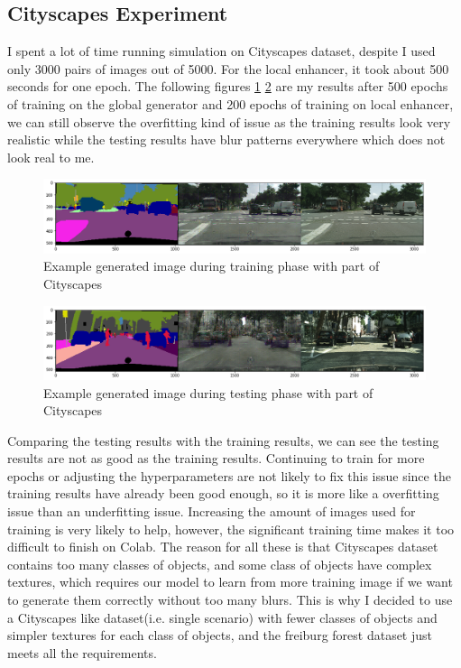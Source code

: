 \subsection{Cityscapes Experiment}
I spent a lot of time running simulation on Cityscapes dataset, despite I used only 3000 
pairs of images out of 5000. For the local enhancer, it took about 500 seconds for one 
epoch. The following figures \ref{fig:Cityscapes-train} \ref{fig:Cityscapes-test} are my 
results after 500 epochs of training on the global generator and 200 epochs of training 
on local enhancer, we can still observe the overfitting kind of issue as the training 
results look very realistic while the testing results have blur patterns everywhere 
which does not look real to me.
\begin{figure}[H]
    \begin{center}
    \includegraphics[width=14cm]{figures/cityscapes-train}
    \end{center}
    \caption{Example generated image during training phase with part of Cityscapes}
    \label{fig:Cityscapes-train}
\end{figure}

\begin{figure}[H]
    \begin{center}
    \includegraphics[width=14cm]{figures/cityscapes-test}
    \end{center}
    \caption{Example generated image during testing phase with part of Cityscapes}
    \label{fig:Cityscapes-test}
\end{figure}

Comparing the testing results with the training results, we can see the testing results
are not as good as the training results.
Continuing to train for more epochs or adjusting the hyperparameters are not likely to fix 
this issue since the training results have already been good enough, so it is more like a 
overfitting issue than an underfitting issue. Increasing the amount of images used for 
training is very likely to help, however, the significant training time makes it too 
difficult to finish on Colab. The reason for all these is that Cityscapes dataset contains 
too many classes of objects, and some class of objects have complex textures, which requires 
our model to learn from more training image if we want to generate them correctly without too 
many blurs.
This is why I decided to use a Cityscapes like dataset(i.e. single scenario) with 
fewer classes of objects and simpler textures for each class of objects, and the freiburg 
forest dataset just meets all the requirements.
